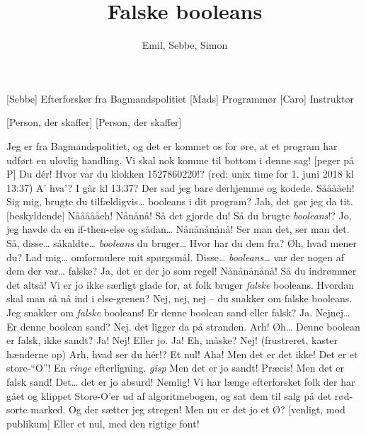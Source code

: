 \documentclass[a4paper,11pt]{article}
\title{Falske booleans}
\author{Emil, Sebbe, Simon}
\begin{document}
\maketitle

\begin{roles}
[Sebbe] Efterforsker fra Bagmandspolitiet
[Mads] Programmør
[Caro] Instruktør
\end{roles}

\begin{props}
[Person, der skaffer]
[Person, der skaffer]
\end{props}


\begin{sketch}

 Jeg er fra Bagmandspolitiet, og det er kommet os for øre, at et program
    har udført en ulovlig handling. Vi skal nok komme til bottom i denne sag!
[peger på P] Du dér! Hvor var du klokken 1527860220!? (red: unix time for 1. juni 2018 kl 13:37)
 A' hva'? I går kl 13:37? Der sad jeg bare derhjemme og kodede.
 Sååååeh! Sig mig, brugte du tilfældigvis{\ldots} booleans i dit program?
 Jah, det gør jeg da tit.
[beskyldende] Nåååååeh! Nånånå! Så det gjorde du! Så du brugte \emph{booleans}!?
 Jo, jeg havde da en if-then-else og sådan{\ldots}
 Nånånånånå! Ser man det, ser man det. Så, disse{\ldots} såkaldte{\ldots} \emph{booleans} du bruger{\ldots} Hvor har du dem fra?
 Øh, hvad mener du?
 Lad mig{\ldots} omformulere mit spørgsmål. Disse{\ldots} \emph{booleans}{\ldots} var der nogen af dem der var{\ldots} falske?
 Ja, det er der jo som regel!
 Nånånånånå! Så du indrømmer det altså! Vi er jo ikke særligt glade for, at folk bruger \emph{falske} booleans.
 Hvordan skal man så nå ind i else-grenen?
 Nej, nej, nej -- du snakker om falske booleans. Jeg snakker om \emph{falske} booleans!
 Er denne boolean sand eller falsk?
 Ja.
 Nejnej{\ldots} Er denne boolean sand?
 Nej, det ligger da på stranden.
 Arh! Øh{\ldots} Denne boolean er falsk, ikke sandt?
 Ja!
 Nej! Eller jo.
 Ja!
 Eh, måske?
 Nej!
 (frustreret, kaster hænderne op) Arh, hvad ser du hér!?
 Et nul!
 Aha! Men det er det ikke! Det er et store-``O''! En \emph{ringe} efterligning.
 \emph{gisp} Men det er jo sandt!
 Præcis! Men det er falsk sand!
 Det{\ldots} det er jo absurd!
 Nemlig! Vi har længe efterforsket folk der har gået og klippet Store-O'er ud
   af algoritmebogen, og sat dem til salg på det rød-sorte marked. Og der sætter jeg stregen! 
 Men nu er det jo et Ø?
[venligt, mod publikum] Eller et nul, med den rigtige font!


\end{sketch}
\end{document}
